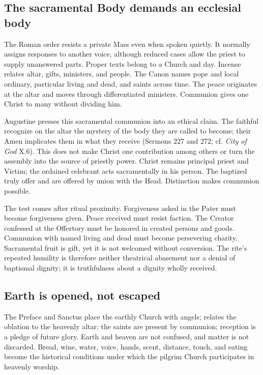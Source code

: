 \subsection{The sacramental Body demands an ecclesial body}

The Roman order resists a private Mass even when spoken quietly. It normally assigns responses to another voice, although reduced cases allow the priest to supply unanswered parts. Proper texts belong to a Church and day. Incense relates altar, gifts, ministers, and people. The Canon names pope and local ordinary, particular living and dead, and saints across time. The peace originates at the altar and moves through differentiated ministers. Communion gives one Christ to many without dividing him.

Augustine presses this sacramental communion into an ethical claim. The faithful recognize on the altar the mystery of the body they are called to become; their Amen implicates them in what they receive (Sermons 227 and 272; cf. \emph{City of God} X.6). This does not make Christ one contribution among others or turn the assembly into the source of priestly power. Christ remains principal priest and Victim; the ordained celebrant acts sacramentally in his person. The baptized truly offer and are offered by union with the Head. Distinction makes communion possible.

The test comes after ritual proximity. Forgiveness asked in the Pater must become forgiveness given. Peace received must resist faction. The Creator confessed at the Offertory must be honored in created persons and goods. Communion with named living and dead must become persevering charity. Sacramental fruit is gift, yet it is not welcomed without conversion. The rite's repeated humility is therefore neither theatrical abasement nor a denial of baptismal dignity; it is truthfulness about a dignity wholly received.

\subsection{Earth is opened, not escaped}

The Preface and Sanctus place the earthly Church with angels;  relates the oblation to the heavenly altar; the saints are present by communion; reception is a pledge of future glory. Earth and heaven are not confused, and matter is not discarded. Bread, wine, water, voice, hands, scent, distance, touch, and eating become the historical conditions under which the pilgrim Church participates in heavenly worship.

